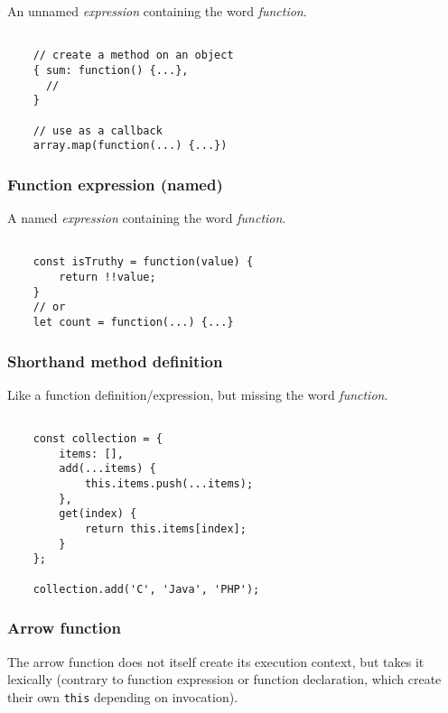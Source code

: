 \documentclass{scrartcl}
\begin{document}
An unnamed \textit{expression} containing the word \textit{function}.

\begin{lstlisting}[style=ES6]

    // create a method on an object
    { sum: function() {...},
      //
    }

    // use as a callback
    array.map(function(...) {...})

\end{lstlisting}


\subsubsection{Function expression (named)}

A named \textit{expression} containing the word \textit{function}.

\begin{lstlisting}[style=ES6]

    const isTruthy = function(value) {
        return !!value;
    }
    // or
    let count = function(...) {...}

\end{lstlisting}

\subsubsection{Shorthand method definition}

Like a function definition/expression, but missing the word \textit{function}.

\begin{lstlisting}[style=ES6]

    const collection = {
        items: [],
        add(...items) {
            this.items.push(...items);
        },
        get(index) {
            return this.items[index];
        }
    };

    collection.add('C', 'Java', 'PHP');

\end{lstlisting}

\subsubsection{Arrow function}

The arrow function does not itself create its execution context, but takes it lexically (contrary to function expression or function declaration, which create their own \lstinline|this| depending on invocation).
\end{document}
